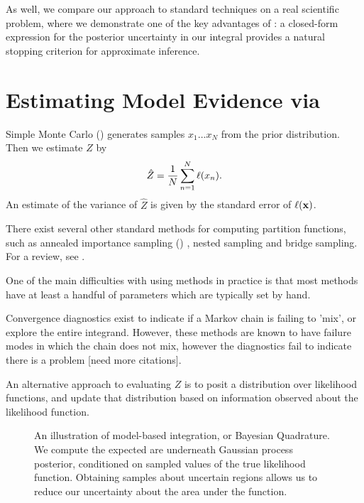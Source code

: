 \documentclass{article}
\begin{document}
As well, we compare our  approach to standard  techniques on a real scientific problem, where we demonstrate one of the key advantages of : a closed-form expression for the posterior uncertainty in our integral provides a natural stopping criterion for approximate inference.

\section{Estimating Model Evidence via }


Simple Monte Carlo () generates samples $x_1 \dots x_N$ from the prior distribution.  Then we estimate $Z$ by $$\hat{Z} = \frac{1}{N} \sum_{n=1}^{N} \lfn(x_n).$$  An estimate of the variance of $\hat{Z}$ is given by the standard error of $\lfn({\bf x})$.


There exist several other standard methods for computing partition functions, such as annealed importance sampling () \citep{neal2001annealed}, nested sampling \citep{skilling2004nested} and bridge sampling.  For a review, see \citet{chen2000monte}.

One of the main difficulties with using  methods in practice is that most methods have at least a handful of parameters which are typically set by hand. 

Convergence diagnostics exist to indicate if a Markov chain is failing to 'mix', or explore the entire integrand.  However, these methods are known to have failure modes in which the chain does not mix, however the diagnostics fail to indicate there is a problem \citep{NealMC} [need more citations].

An alternative approach to evaluating $Z$ is to posit a distribution over likelihood functions, and update that distribution based on information observed about the likelihood function.

 \begin{figure}
 \centering
 \caption{An illustration of model-based integration, or Bayesian Quadrature.  We compute the expected are underneath Gaussian process posterior, conditioned on sampled values of the true likelihood function.  Obtaining samples about uncertain regions allows us to reduce our uncertainty about the area under the function.  }
 \label{fig:model_based}
 \end{figure}
\end{document}
